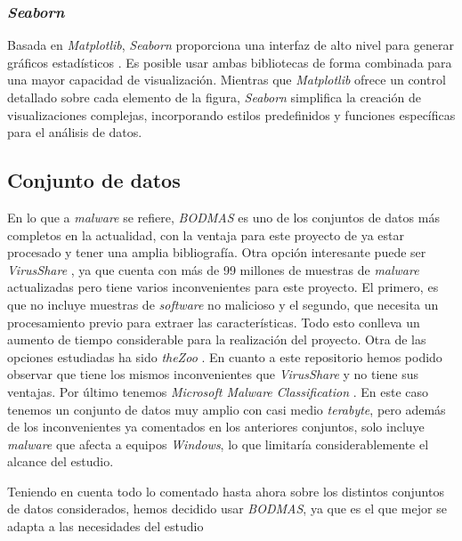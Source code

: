 \newpage
\subsubsection{\textit{Seaborn}}
\label{subsubsec:seaborn}

Basada en \textit{Matplotlib}, \textit{Seaborn} proporciona una interfaz de alto nivel para generar gráficos estadísticos \cite{seaborn}. Es posible usar ambas bibliotecas de forma combinada para una mayor capacidad de visualización. Mientras que \textit{Matplotlib} ofrece un control detallado sobre cada elemento de la figura, \textit{Seaborn} simplifica la creación de visualizaciones complejas, incorporando estilos predefinidos y funciones específicas para el análisis de datos.

\subsection{Conjunto de datos}
\label{subsec:select_dataset}

En lo que a \textit{malware} se refiere, \textit{BODMAS} \cite{bodmas} es uno de los conjuntos de datos más completos en la actualidad, con la ventaja para este proyecto de ya estar procesado y tener una amplia bibliografía. Otra opción interesante puede ser \textit{VirusShare} \cite{virusshare}, ya que cuenta con más de 99 millones de muestras de \textit{malware} actualizadas pero tiene varios inconvenientes para este proyecto. El primero, es que no incluye muestras de \textit{software} no malicioso y el segundo, que necesita un procesamiento previo para extraer las características. Todo esto conlleva un aumento de tiempo considerable para la realización del proyecto. Otra de las opciones estudiadas ha sido \textit{theZoo} \cite{thezoo}. En cuanto a este repositorio hemos podido observar que tiene los mismos inconvenientes que \textit{VirusShare} y no tiene sus ventajas. Por último tenemos \textit{Microsoft Malware Classification} \cite{malware-classification}. En este caso tenemos un conjunto de datos muy amplio con casi medio \textit{terabyte}, pero además de los inconvenientes ya comentados en los anteriores conjuntos, solo incluye \textit{malware} que afecta a equipos \textit{Windows}, lo que limitaría considerablemente el alcance del estudio.

\vspace{1em}

Teniendo en cuenta todo lo comentado hasta ahora sobre los distintos conjuntos de datos considerados, hemos decidido usar \textit{BODMAS}, ya que es el que mejor se adapta a las necesidades del estudio

